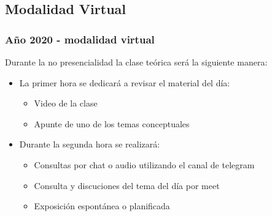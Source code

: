 \documentclass[aspectratio=169,compress]{beamer}
\begin{document}










\subsection{Modalidad Virtual}


\begin{frame}[fragile]
  \frametitle{Año 2020 - modalidad virtual}
  Durante la no presencialidad la clase teórica será la siguiente manera:

\bigskip
\begin{itemize}
\item La primer hora se dedicará a revisar el material del día:
\begin{itemize}
\item Video de la clase
\item Apunte de uno de los temas conceptuales
\end{itemize}
\end{itemize}

\bigskip

\begin{itemize}
\item Durante la segunda hora se realizará:
\begin{itemize}
\item Consultas por chat o audio utilizando el canal de telegram
\item Consulta y discuciones del tema del día por meet
\item Exposición espontánea o planificada
\end{itemize}
\end{itemize}

\end{frame}
\end{document}
